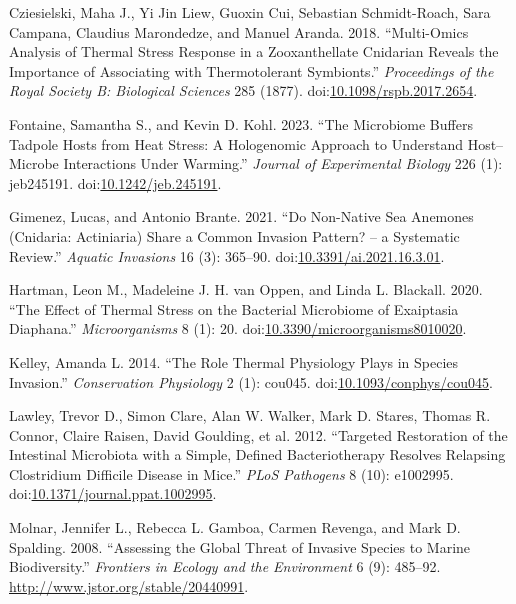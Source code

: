 \documentclass[
]{article}
\newlength{\cslhangindent}
\newlength{\cslentryspacingunit} %
\newenvironment{CSLReferences}[2] %
 {%
  \setlength{\parindent}{0pt}
  \ifodd #1
  \let\oldpar\par
  \def\par{\hangindent=\cslhangindent\oldpar}
  \fi
  \setlength{\parskip}{#2\cslentryspacingunit}
 }%
 {}
\begin{document}
\begin{CSLReferences}{1}{0}
\leavevmode{}%
Cziesielski, Maha J., Yi Jin Liew, Guoxin Cui, Sebastian Schmidt-Roach,
Sara Campana, Claudius Marondedze, and Manuel Aranda. 2018.
{``Multi-Omics Analysis of Thermal Stress Response in a Zooxanthellate
Cnidarian Reveals the Importance of Associating with Thermotolerant
Symbionts.''} \emph{Proceedings of the Royal Society B: Biological
Sciences} 285 (1877).
doi:\href{https://doi.org/10.1098/rspb.2017.2654}{10.1098/rspb.2017.2654}.

\leavevmode{}%
Fontaine, Samantha S., and Kevin D. Kohl. 2023. {``The Microbiome
Buffers Tadpole Hosts from Heat Stress: A Hologenomic Approach to
Understand Host--Microbe Interactions Under Warming.''} \emph{Journal of
Experimental Biology} 226 (1): jeb245191.
doi:\href{https://doi.org/10.1242/jeb.245191}{10.1242/jeb.245191}.

\leavevmode{}%
Gimenez, Lucas, and Antonio Brante. 2021. {``Do Non-Native Sea Anemones
(Cnidaria: Actiniaria) Share a Common Invasion Pattern? -- a Systematic
Review.''} \emph{Aquatic Invasions} 16 (3): 365--90.
doi:\href{https://doi.org/10.3391/ai.2021.16.3.01}{10.3391/ai.2021.16.3.01}.

\leavevmode{}%
Hartman, Leon M., Madeleine J. H. van Oppen, and Linda L. Blackall.
2020. {``The Effect of Thermal Stress on the Bacterial Microbiome of
Exaiptasia Diaphana.''} \emph{Microorganisms} 8 (1): 20.
doi:\href{https://doi.org/10.3390/microorganisms8010020}{10.3390/microorganisms8010020}.

\leavevmode{}%
Kelley, Amanda L. 2014. {``The Role Thermal Physiology Plays in Species
Invasion.''} \emph{Conservation Physiology} 2 (1): cou045.
doi:\href{https://doi.org/10.1093/conphys/cou045}{10.1093/conphys/cou045}.

\leavevmode{}%
Lawley, Trevor D., Simon Clare, Alan W. Walker, Mark D. Stares, Thomas
R. Connor, Claire Raisen, David Goulding, et al. 2012. {``Targeted
Restoration of the Intestinal Microbiota with a Simple, Defined
Bacteriotherapy Resolves Relapsing Clostridium Difficile Disease in
Mice.''} \emph{{PLoS} Pathogens} 8 (10): e1002995.
doi:\href{https://doi.org/10.1371/journal.ppat.1002995}{10.1371/journal.ppat.1002995}.

\leavevmode{}%
Molnar, Jennifer L., Rebecca L. Gamboa, Carmen Revenga, and Mark D.
Spalding. 2008. {``Assessing the Global Threat of Invasive Species to
Marine Biodiversity.''} \emph{Frontiers in Ecology and the Environment}
6 (9): 485--92. \url{http://www.jstor.org/stable/20440991}.


\end{CSLReferences}
\end{document}
